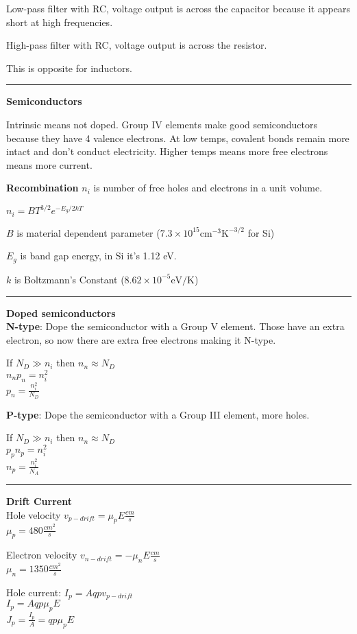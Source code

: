 \documentclass[a4paper]{article}
\begin{document}
\begin{multicols}{3}
Low-pass filter with RC, voltage output is across the
capacitor because it appears short at high frequencies.

High-pass filter with RC, voltage output is across the resistor.

This is opposite for inductors.

\hrule

\textbf{Semiconductors}

Intrinsic means not doped. Group IV elements make good
semiconductors because they have 4 valence electrons.
At low temps, covalent bonds remain more intact and
don't conduct electricity. Higher temps means more free
electrons means more current.

\textbf{Recombination}
$n_i$ is number of free holes and electrons in a unit volume.

$n_i = BT^{3/2} e^{-E_g / 2kT}$

$B$ is material dependent parameter ($7.3 \times 10^{15} \si{\cm}^{-3}\si{\K}^{-3/2}$ for Si)

$E_g$ is band gap energy, in Si it's 1.12 eV.

$k$ is Boltzmann's Constant ($8.62 \times 10^{-5} \si{\eV}/\si{\K}$)

\hrule 

\textbf{Doped semiconductors}\\ 
\textbf{N-type}: Dope the semiconductor with a Group V element.
Those have an extra electron, so now there are extra
free electrons making it N-type.

If $N_D \gg n_i$ then $n_n \approx N_D$ \\
$n_n p_n = n_i^2$ \\
$p_n = \frac{n_i^2}{N_D}$

\textbf{P-type}: Dope the semiconductor with a Group III element,
more holes.


If $N_D \gg n_i$ then $n_n \approx N_D$ \\
$p_p n_p = n_i^2$ \\
$n_p = \frac{n_i^2}{N_A}$

\hrule

\textbf{Drift Current} \\
Hole velocity $v_{p-drift}=\mu_p E \frac{cm}{s}$\\
$\mu_p = 480 \frac{cm^2}{s}$

Electron velocity $v_{n-drift}=- \mu_n E \frac{cm}{s}$\\
$\mu_n = 1350 \frac{cm^2}{s}$

Hole current:
$I_p = Aqpv_{p-drift}$\\
$I_p = Aqp\mu_p E$\\
$J_p = \frac{I_p}{A} = qp\mu_p E$


\end{multicols}
\end{document}
